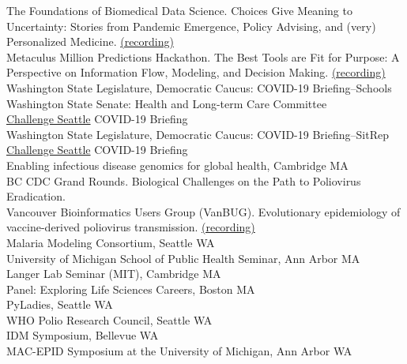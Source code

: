\documentclass{article}
\begin{document}
\begin{llist}
    {The Foundations of Biomedical Data Science. Choices Give Meaning to Uncertainty: Stories from Pandemic Emergence, Policy Advising, and (very) Personalized Medicine. \href{https://www.youtube.com/watch?v=TZrNbMG0nGY}{(recording)}} \\
	{Metaculus Million Predictions Hackathon. The Best Tools are Fit for Purpose: A Perspective on Information Flow, Modeling, and Decision Making.  \href{https://www.youtube.com/watch?v=3ikps84QztA}{(recording)}} \\
	{Washington State Legislature, Democratic Caucus: COVID-19 Briefing--Schools} \\
	{Washington State Senate: Health and Long-term Care Committee} \\
	{\href{https://www.challengeseattle.com/}{Challenge Seattle} COVID-19 Briefing} \\
	{Washington State Legislature, Democratic Caucus: COVID-19 Briefing--SitRep} \\
	{\href{https://www.challengeseattle.com/}{Challenge Seattle} COVID-19 Briefing} \\
	{Enabling infectious disease genomics for global health, Cambridge MA} \\
	{BC CDC Grand Rounds. Biological Challenges on the Path to Poliovirus Eradication.}  \\
	{Vancouver Bioinformatics Users Group (VanBUG). Evolutionary epidemiology of vaccine-derived poliovirus transmission. \href{https://www.youtube.com/watch?v=83X-HwkMp3g}{(recording)}}  \\
	{Malaria Modeling Consortium, Seattle WA} \\
	{University of Michigan School of Public Health Seminar, Ann Arbor MA}  \\
	{Langer Lab Seminar (MIT), Cambridge MA} \\
	{Panel: Exploring Life Sciences Careers, Boston MA} \\
	{PyLadies, Seattle WA}  \\
	{WHO Polio Research Council, Seattle WA} \\
	{IDM Symposium, Bellevue WA} \\ 
	{MAC-EPID Symposium at the University of Michigan, Ann Arbor WA}  \\

\end{llist}
\end{document}
